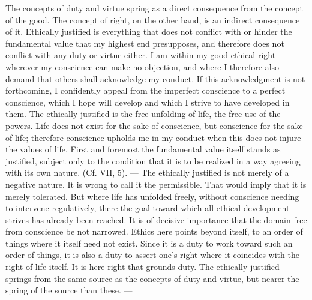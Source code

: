 \documentclass[12pt,a4paper,openany]{book}
\newcommand{\opage}[1]{\marginnote{\footnotesize\textit{[#1]}}}
\begin{document}
The concepts of duty and virtue spring as a direct consequence from the concept of the good. The concept
of right, on the other hand, is an indirect consequence of it. Ethically justified is everything that does
not conflict with or hinder the fundamental value that my highest end presupposes, and therefore does not
conflict with any duty or virtue either. I am within my good ethical right wherever my conscience can make
no objection, and where I therefore also demand that others shall acknowledge my conduct. If this
acknowledgment is not forthcoming, I confidently appeal from the imperfect conscience to a perfect
conscience, which I hope will develop and which I strive to have developed in them. The ethically justified
is the free unfolding of life, the free use of the powers. Life does not exist for the sake of conscience,
but conscience for the sake of life; therefore
\opage{157}conscience upholds me in my conduct when this does not injure the values of life. First and foremost the
fundamental value itself stands as justified, subject only to the condition that it is to be realized in a
way agreeing with its own nature. (Cf. VII, 5). --- The ethically justified is not merely of a negative
nature. It is wrong to call it the permissible. That would imply that it is merely tolerated. But where
life has unfolded freely, without conscience needing to intervene regulatively, there the goal toward which
all ethical development strives has already been reached. It is of decisive importance that the domain free
from conscience be not narrowed. Ethics here points beyond itself, to an order of things where it itself
need not exist. Since it is a duty to work toward such an order of things, it is also a duty to assert one's
right where it coincides with the right of life itself. It is here right that grounds duty. The ethically
justified springs from the same source as the concepts of duty and virtue, but nearer the spring of the
source than these. ---
\end{document}
